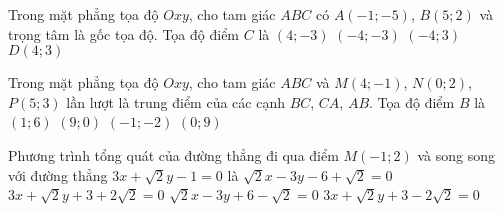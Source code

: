 \begin{ex}%
	Trong mặt phẳng tọa độ $Oxy$, cho tam giác $ABC$ có $A(-1;-5)$, $B(5;2)$ và trọng tâm là gốc tọa độ. Tọa độ điểm $C$ là
	\choice
	{$(4;-3)$}
	{$(-4;-3)$}
	{\True $(-4;3)$}
	{$D(4;3)$}
\end{ex}
\begin{ex}%
	Trong mặt phẳng tọa độ $Oxy$, cho tam giác $ABC$ và $M(4;-1)$, $N(0;2)$, $P(5;3)$ lần lượt là trung điểm của các cạnh $BC$, $CA$, $AB$. Tọa độ điểm $B$ là
	\choice
	{$(1;6)$}
	{\True $(9;0)$}
	{$(-1;-2)$}
	{$(0;9)$}
\end{ex}

\begin{ex}%
	Phương trình tổng quát của đường thẳng đi qua điểm $M(-1;2)$ và song song với đường thẳng $3x+\sqrt{2}y-1=0$ là
	\choice
	{$\sqrt{2}x-3y-6+\sqrt{2}=0$}
	{$3x+\sqrt{2}y+3+2\sqrt{2}=0$}
	{$\sqrt{2}x-3y+6-\sqrt{2}=0$}
	{\True $3x+\sqrt{2}y+3-2\sqrt{2}=0$}
\end{ex}

